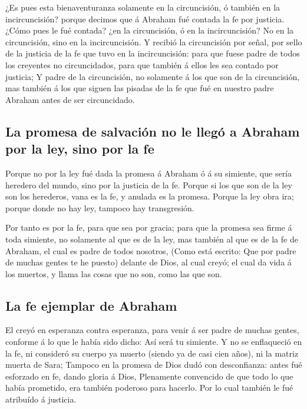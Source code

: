  ¿Es pues esta bienaventuranza solamente en la
circuncisión, ó también en la incircuncisión? porque decimos que á
Abraham fué contada la fe por justicia.  ¿Cómo pues le
fué contada? ¿en la circuncisión, ó en la incircuncisión? No en la
circuncisión, sino en la incircuncisión.  Y recibió la
circuncisión por señal, por sello de la justicia de la fe que tuvo en la
incircuncisión: para que fuese padre de todos los creyentes no
circuncidados, para que también á ellos les sea contado por justicia;
 Y padre de la circuncisión, no solamente á los que son
de la circuncisión, mas también á los que siguen las pisadas de la fe
que fué en nuestro padre Abraham antes de ser circuncidado.

\hypertarget{la-promesa-de-salvaciuxf3n-no-le-lleguxf3-a-abraham-por-la-ley-sino-por-la-fe}{%
\subsection{La promesa de salvación no le llegó a Abraham por la ley,
sino por la
fe}\label{la-promesa-de-salvaciuxf3n-no-le-lleguxf3-a-abraham-por-la-ley-sino-por-la-fe}}

 Porque no por la ley fué dada la promesa á Abraham ó á
su simiente, que sería heredero del mundo, sino por la justicia de la
fe.  Porque si los que son de la ley son los herederos,
vana es la fe, y anulada es la promesa.  Porque la ley
obra ira; porque donde no hay ley, tampoco hay transgresión.

 Por tanto es por la fe, para que sea por gracia; para
que la promesa sea firme á toda simiente, no solamente al que es de la
ley, mas también al que es de la fe de Abraham, el cual es padre de
todos nosotros,  (Como está escrito: Que por padre de
muchas gentes te he puesto) delante de Dios, al cual creyó; el cual da
vida á los muertos, y llama las cosas que no son, como las que son.

\hypertarget{la-fe-ejemplar-de-abraham}{%
\subsection{La fe ejemplar de Abraham}\label{la-fe-ejemplar-de-abraham}}

 El creyó en esperanza contra esperanza, para venir á ser
padre de muchas gentes, conforme á lo que le había sido dicho: Así será
tu simiente.  Y no se enflaqueció en la fe, ni consideró
su cuerpo ya muerto (siendo ya de casi cien años), ni la matriz muerta
de Sara;  Tampoco en la promesa de Dios dudó con
desconfianza: antes fué esforzado en fe, dando gloria á Dios,
 Plenamente convencido de que todo lo que había
prometido, era también poderoso para hacerlo.  Por lo
cual también le fué atribuído á justicia.

